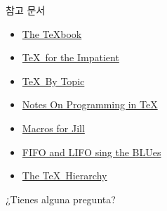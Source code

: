 \documentclass{beamer}
\begin{document}
%
\begin{frame}{참고 문서}
  \begin{itemize}
  \item \href{http://ftp.ktug.org/tex-archive/systems/knuth/dist/tex/}
    {The \TeX book}
  \item \href{http://ftp.ktug.org/tex-archive/info/impatient/book.pdf}
    {\TeX\ for the Impatient}
  \item \href{http://ftp.ktug.org/tex-archive/info/texbytopic/TeXbyTopic.pdf}
    {\TeX\ By Topic}
  \item \href{http://pgfplots.sourceforge.net/TeX-programming-notes.pdf}
    {Notes On Programming in TeX}
  \item \href{https://www.tug.org/TUGboat/tb08-3/tb19knut.pdf}
    {Macros for Jill}
  \item \href{https://www.tug.org/TUGboat/tb14-1/tb38laan.pdf}
    {FIFO and LIFO sing the BLUes}
  \item \href{https://www.tug.org/TUGboat/tb15-1/tb42arseneau.pdf}
    {The TeX\ Hierarchy}
  \end{itemize}
\end{frame}


%
\begin{frame}[standout]
  ¿Tienes alguna pregunta?
\end{frame}
\end{document}
